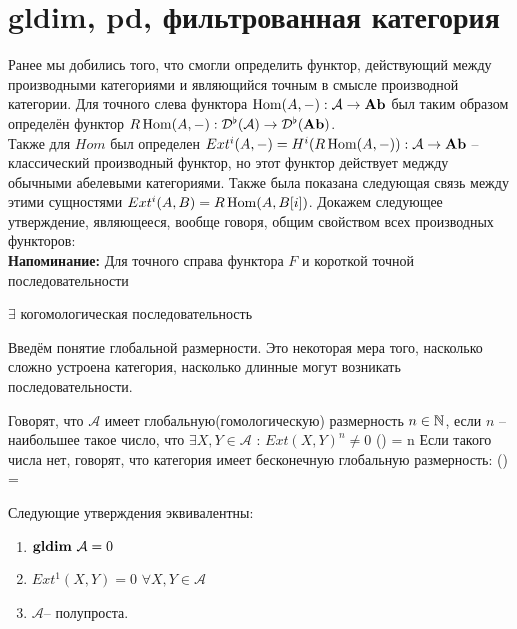 \documentclass[../main.tex]{subfiles}
\begin{document}
\section{gldim, pd, фильтрованная категория}
Ранее мы добились того, что смогли определить функтор, действующий между производными категориями и являющийся точным в смысле производной категории. 
Для точного слева функтора $\operatorname{Hom}(A, -) : \mathcal{A} \rightarrow \mathbf{Ab}$ был таким образом определён функтор $R\operatorname{Hom}(A, -) : \mathcal{D^\flat (A)} \rightarrow \mathcal{D^\flat (\mathbf{Ab})}$.\\
Также для $Hom$ был определен $Ext^i(A, -) = H^i(R\operatorname{Hom}(A, -)) : \mathcal{A} \rightarrow \mathbf{Ab}$ -- классический производный функтор, но этот функтор действует меджду обычными абелевыми категориями. Также была показана следующая связь между этими сущностями $Ext^i(A, B) = R\operatorname{Hom}(A, B[i])$.
Докажем следующее утверждение, являющееся, вообще говоря, общим свойством всех производных функторов:\\
\textbf{Напоминание:} Для точного справа функтора $F$ и короткой точной последовательности  $\exists$ когомологическая последовательность 
Введём понятие глобальной размерности. Это некоторая мера того, насколько сложно устроена категория, насколько длинные могут возникать последовательности.
\begin{to_def}
\label{gld}
Говорят, что $\mathcal{A}$ имеет глобальную(гомологическую) размерность $n\in \mathbb{N}$, если $n$ -- наибольшее такое число, что $\exists X, Y \in \mathcal{A}$ : $Ext(X, Y)^n \neq 0$
\bee
{}() = n
\eee
Если такого числа нет, говорят, что категория имеет бесконечную глобальную размерность:
\bee
{}() = \infty
\eee
\end{to_def}
\begin{to_thr}
Следующие утверждения эквивалентны:
\begin{enumerate}
    \item $\mathbf{gldim}\text{ } \mathcal{A} = 0$
    \item $Ext^1(X, Y) = 0$  $\forall X, Y \in \mathcal{A}$
    \item $\mathcal{A}$-- полупроста.
\end{enumerate}
\end{to_thr}
\end{document}
